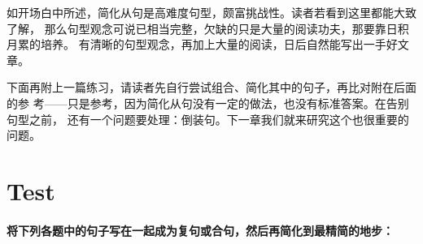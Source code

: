 如开场白中所述，简化从句是高难度句型，颇富挑战性。读者若看到这里都能大致了解，
那么句型观念可说已相当完整，欠缺的只是大量的阅读功夫，那要靠日积月累的培养。
有清晰的句型观念，再加上大量的阅读，日后自然能写出一手好文章。

下面再附上一篇练习，请读者先自行尝试组合、简化其中的句子，再比对附在后面的参
考——只是参考，因为简化从句没有一定的做法，也没有标准答案。在告别句型之前，
还有一个问题要处理：倒装句。下一章我们就来研究这个也很重要的问题。

\section{Test}

\paragraph{将下列各题中的句子写在一起成为复句或合句，然后再简化到最精简的地步：}

